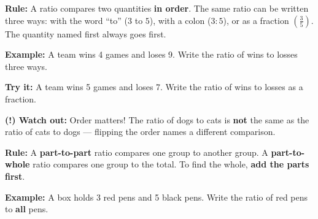 \documentclass[12pt]{article}
\begin{document}


\begin{formulabox}
\textbf{Rule:} A ratio compares two quantities \textbf{in order}. The same ratio
can be written three ways: with the word ``to'' ($3$ to $5$), with a colon
($3{:}5$), or as a fraction $\left(\tfrac{3}{5}\right)$. The quantity named
first always goes first.
\end{formulabox}

\begin{examplebox}
\textbf{Example:} \quad A team wins 4 games and loses 9. Write the ratio of wins
to losses three ways.
\end{examplebox}

\begin{tryitbox}
\textbf{Try it:} \quad A team wins 5 games and loses 7. Write the ratio of wins
to losses as a fraction.\\[2pt]
\end{tryitbox}

\begin{watchoutbox}
\textbf{(!) Watch out:} Order matters! The ratio of dogs to cats is \textbf{not}
the same as the ratio of cats to dogs — flipping the order names a different
comparison.
\end{watchoutbox}


\begin{formulabox}
\textbf{Rule:} A \textbf{part-to-part} ratio compares one group to another
group. A \textbf{part-to-whole} ratio compares one group to the total. To find
the whole, \textbf{add the parts first}.
\end{formulabox}

\begin{examplebox}
\textbf{Example:} \quad A box holds 3 red pens and 5 black pens. Write the ratio
of red pens to \textbf{all} pens.
\end{examplebox}
\end{document}
